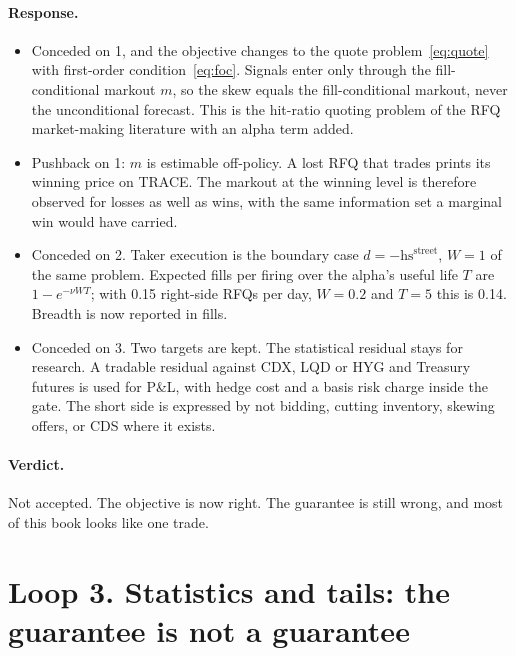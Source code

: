 \documentclass[11pt,letterpaper]{article}
\newcommand{\hs}{\mathrm{hs}}             %
\begin{document}
\paragraph{Response.}
\begin{itemize}[itemsep=2pt,topsep=2pt]
\item Conceded on 1, and the objective changes to the quote problem~\eqref{eq:quote} with first-order condition~\eqref{eq:foc}. Signals enter only through the fill-conditional markout $m$, so the skew equals the fill-conditional markout, never the unconditional forecast. This is the hit-ratio quoting problem of the RFQ market-making literature \cite{hitratio2026} with an alpha term added.
\item Pushback on 1: $m$ is estimable off-policy. A lost RFQ that trades prints its winning price on TRACE. The markout at the winning level is therefore observed for losses as well as wins, with the same information set a marginal win would have carried.
\item Conceded on 2. Taker execution is the boundary case $d=-\hs^{\mathrm{street}}$, $W=1$ of the same problem. Expected fills per firing over the alpha's useful life $T$ are $1-e^{-\nu WT}$; with 0.15 right-side RFQs per day, $W=0.2$ and $T=5$ this is 0.14. Breadth is now reported in fills.
\item Conceded on 3. Two targets are kept. The statistical residual stays for research. A tradable residual against CDX, LQD or HYG and Treasury futures is used for P\&L, with hedge cost and a basis risk charge inside the gate. The short side is expressed by not bidding, cutting inventory, skewing offers, or CDS where it exists.
\end{itemize}

\paragraph{Verdict.} Not accepted. The objective is now right. The guarantee is still wrong, and most of this book looks like one trade.

\section{Loop 3. Statistics and tails: the guarantee is not a guarantee}
\end{document}
